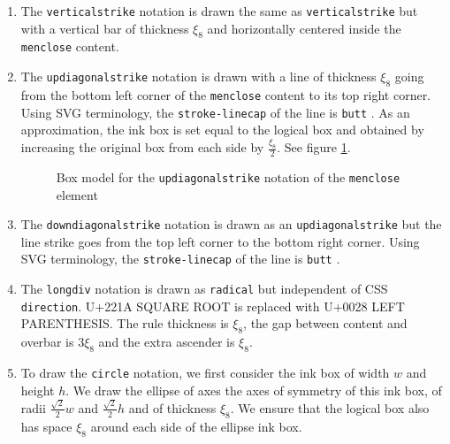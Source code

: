 \begin{enumerate}
\item The {\tt verticalstrike} notation is drawn the same as
  {\tt verticalstrike} but with a vertical bar
  of thickness $\xi_8$ and horizontally centered inside the {\tt menclose}
  content.
\item The {\tt updiagonalstrike} notation is drawn with a line
  of thickness $\xi_8$  going from the bottom left corner of the {\tt menclose}
  content to its top right corner. Using SVG terminology, the
  {\tt stroke-linecap} of the line is {\tt butt} \cite{SVG11}.
  As an approximation, the ink box
  is set equal to the logical box and obtained by increasing the original box
  from each side by $\frac{\xi_8}{2}$.
  See figure \ref{fig:MencloseUpDiagonalStrikeBoxModel}.

  \begin{figure}
\centering
{}
  \caption{Box model for the {\tt updiagonalstrike}
    notation of the {\tt menclose} element}
\label{fig:MencloseUpDiagonalStrikeBoxModel}
\end{figure}

\item The {\tt downdiagonalstrike} notation is drawn as an
  {\tt updiagonalstrike}
  but the line strike goes from the top left corner to the bottom right corner.
  Using SVG terminology, the
  {\tt stroke-linecap} of the line is {\tt butt} \cite{SVG11}.
\item The {\tt longdiv} notation is drawn as {\tt radical} but independent
  of CSS {\tt direction}. U+221A SQUARE ROOT is replaced with
  U+0028 LEFT PARENTHESIS. The rule thickness is $\xi_8$,
  the gap between content and overbar is $3\xi_8$ and the extra ascender
  is $\xi_8$.
\item  To draw the {\tt circle} notation, we first consider the ink box of
  width $w$ and height $h$. We draw the ellipse
  of axes the axes of symmetry of this ink box, of radii
  $\frac{\sqrt{2}}{2} w$ and $\frac{\sqrt{2}}{2} h$ and of thickness $\xi_8$.
  We ensure that the logical box also has space $\xi_8$ around each side
  of the ellipse ink box.
  \begin{figure}
\centering
\begin{tikzpicture}[yscale=-1]


\end{tikzpicture}
\end{figure}
\end{enumerate}
